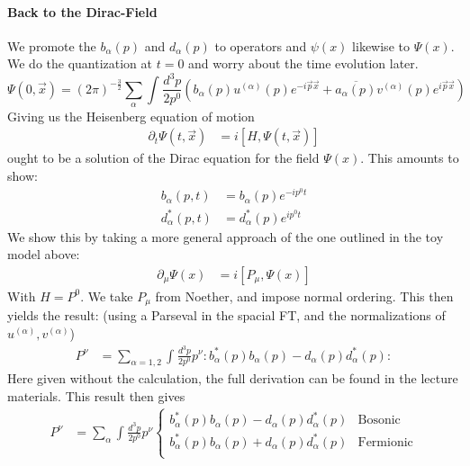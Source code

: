 \documentclass{report}
\begin{document}
\paragraph{Back to the Dirac-Field}  
We promote the $b_\alpha\left( p \right) $ and $d_\alpha\left( p \right) $ to operators and $\psi\left( x \right) $ likewise to $\Psi\left( x \right) $. We do the quantization at $t=0$ and worry about the time evolution later.
\[
  \Psi\left( 0, \vec{x} \right) = \left( 2\pi \right) ^{-\frac{3}{2} } \sum_{\alpha}^{} \int_{}^{}  \frac{d^3p}{2p^{0} } \left(  b_\alpha \left( p \right) u^{\left( \alpha \right) } \left( p \right) e^{-i \vec{p} \vec{x}} + \overline{a_\alpha\left( p \right) } v^{\left( \alpha \right) } \left( p \right) e^{i \vec{p} \vec{x}}  \right)
\] 
Giving us the Heisenberg equation of motion
\begin{align*}
  \partial_t \Psi\left( t,\vec{x} \right) &= i \left[ H, \Psi\left( t,\vec{x} \right)  \right] 
\end{align*}
ought to be a solution of the Dirac equation for the field $\Psi\left( x \right) $. This amounts to show:
\begin{align*}
  b_\alpha\left( p,t \right) &= b_\alpha\left( p \right) e^{-ip^{0} t}  \\
  d_\alpha ^{*} \left( p,t \right) &= d_\alpha ^{*} \left( p \right) e^{ip^{0} t}  
\end{align*}
We show this by taking a more general approach of the one outlined in the toy model above:
\begin{align*}
  \partial_\mu \Psi\left( x \right) &= i\left[ P_\mu, \Psi\left( x \right)  \right] 
\end{align*}
With $H = P^{0} $. We take $P_\mu$ from Noether, and impose normal ordering. This then yields the result: (using a Parseval in the spacial FT, and the normalizations of $u^{\left( \alpha \right) } , v^{\left( \alpha \right) } $)
\begin{align*}
  P^{\nu} &= \sum_{\alpha = 1,2}^{} \int_{}^{} \frac{d^3p}{2p^{0} } p^{\nu} :b_\alpha ^{*} \left( p \right) b_\alpha \left( p \right) - d_\alpha \left( p \right) d_\alpha ^{*} \left( p \right) : 
\end{align*}
Here given without the calculation, the full derivation can be found in the lecture materials. This result then gives
\begin{align*}
  P^{\nu} &= \sum_{\alpha}^{} \int_{}^{} \frac{d^3 p}{2p^{0} } p^{\nu} \begin{cases}
    b_\alpha ^{*} \left( p \right) b_\alpha \left( p \right) - d_\alpha \left( p \right) d_\alpha ^{*} \left( p \right)  & \text{Bosonic} \\
    b_\alpha ^{*} \left( p \right) b_\alpha \left( p \right) + d_\alpha \left( p \right) d_\alpha ^{*} \left( p \right)  & \text{Fermionic} \\
  \end{cases}
\end{align*}
\end{document}
